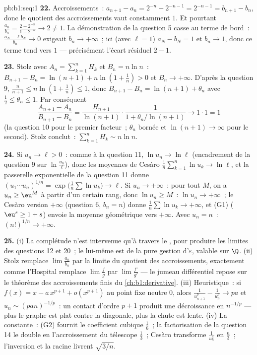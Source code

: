 \begin{solution}{pb:b1:seq:1}
\textbf{22.} Accroissements~: $a_{n+1} - a_n = 2^{-n} - 2^{-n-1} =
2^{-n-1} = b_{n+1} - b_n$, donc le quotient des accroissements vaut
constamment $1$. Et pourtant $\frac{a_n}{b_n} = \frac{2 - 2^{-n}}{1 -
2^{-n}} \to 2 \neq 1$. La démonstration de la question 5 casse au
terme de bord~: $\frac{a_N - \ell b_N}{b_n} \to 0$ exigeait $b_n
\to +\infty$~; ici (avec $\ell = 1$) $a_N - b_N = 1$ et $b_n
\to 1$, donc ce terme tend vers $1$ --- précisément l'écart résiduel
$2 - 1$.

\textbf{23.} Stolz avec $A_n = \sum_{k=1}^n H_k$ et $B_n = n\ln
n$~: $B_{n+1} - B_n = \ln(n+1) + n\ln(1 + \frac1n) > 0$ et $B_n
\to +\infty$. D'après la question 9, $\frac{n}{n+1} \leq n\ln(1 +
\frac1n) \leq 1$, donc $B_{n+1} - B_n = \ln(n+1) + \theta_n$ avec
$\frac12 \leq \theta_n \leq 1$. Par conséquent
\[
\frac{A_{n+1} - A_n}{B_{n+1} - B_n}
= \frac{H_{n+1}}{\ln(n+1)}\cdot
\frac{1}{1 + \theta_n/\ln(n+1)} \longrightarrow 1 \cdot 1 = 1
\]
(la question 10 pour le premier facteur~; $\theta_n$ bornée et
$\ln(n+1) \to \infty$ pour le second). Stolz conclut~:
$\sum_{k=1}^n H_k \sim n\ln n$.

\textbf{24.} Si $u_n \to \ell > 0$~: comme à la question 11, $\ln u_n
\to \ln\ell$ (encadrement de la question 9 sur $\ln\frac{u_n}{\ell}$),
donc les moyennes de Cesàro $\frac1n\sum_{k=1}^n \ln u_k \to
\ln\ell$, et la passerelle exponentielle de la question 11 donne
$(u_1\cdots u_n)^{1/n} = \exp\bigl(\frac1n\sum\ln u_k\bigr) \to \ell$.
Si $u_n \to +\infty$~: pour tout $M$, on a $u_n \geq \eu^M$ à partir
d'un certain rang, donc $\ln u_n \geq M$~: $\ln u_n \to +\infty$~; le
Cesàro version $+\infty$ (question 6, $b_n = n$) donne
$\frac1n\sum \ln u_k \to +\infty$, et (G1) ($\eu^s \geq 1 + s$) envoie
la moyenne géométrique vers $+\infty$. Avec $u_n = n$~: $(n!)^{1/n}
\to +\infty$.

\textbf{25.} (i) La complétude n'est intervenue qu'à travers le
, pour produire les limites des
questions 12 et 20~; le  lui-même est de la
pure gestion d'$\varepsilon$, valable sur $\Q$. (ii) Stolz remplace
$\lim \frac{a_n}{b_n}$ par la limite du quotient des accroissements,
exactement comme l'Hospital remplace $\lim\frac fg$ par
$\lim\frac{f'}{g'}$ --- le jumeau différentiel repose sur le théorème
des accroissements finis du \cref{ch:b1:derivative}. (iii)
Heuristique~: si $f(x) = x - a\,x^{p+1} + o(x^{p+1})$ au point fixe
neutre $0$, alors $\frac{1}{u_{n+1}^p} - \frac{1}{u_n^p} \to pa$ et
$u_n \sim (pan)^{-1/p}$~: un contact d'ordre $p + 1$ produit une
décroissance en $n^{-1/p}$ --- plus le graphe est plat contre la
diagonale, plus la chute est lente. (iv) La constante~: (G2) fournit
le coefficient cubique $\frac16$~; la factorisation de la question 14
le double en l'accroissement du télescope $\frac13$~; Cesàro
transforme $\frac{1}{u_n^2}$ en $\frac n3$~; l'inversion et la racine
livrent $\sqrt{3/n}$.
\end{solution}
